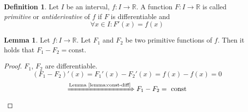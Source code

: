 \documentclass[a4paper,landscape,twocolumn]{article}
\theoremstyle{definition}
\newtheorem{defi}{Definition}
\newtheorem{lemma}{Lemma}
\begin{document}
\begin{defi}
  Let $I$ be an interval, $f: I \to \mathbb R$.
  A function $F: I \to \mathbb R$ is called \emph{primitive} or \emph{antiderivative} of $f$
  if $F$ is differentiable and
  \[ \forall x \in I: F'(x) = f(x) \]
\end{defi}
\begin{lemma}
  Let $f: I \to \mathbb R$. Let $F_1$ and $F_2$ be two primitive functions of $f$.
  Then it holds that $F_1 - F_2 = \text{const}$.
\end{lemma}
\begin{proof}
  $F_1$, $F_2$ are differentiable.
  \[ (F_1 - F_2)'(x) = F_1'(x) - F_2'(x) = f(x) - f(x) = 0 \]
  \[ \xRightarrow{\text{Lemma~\ref{lemma:const-diff}}} F_1 - F_2 = \text{ const} \]
\end{proof}
\end{document}
